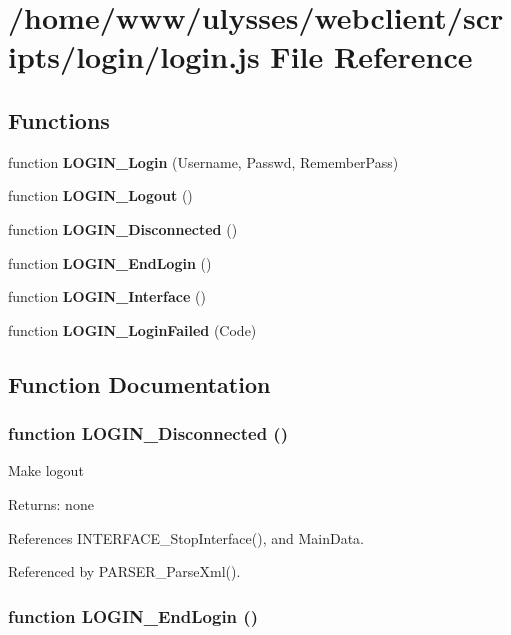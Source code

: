 \section{/home/www/ulysses/webclient/scripts/login/login.js File Reference}
\label{login_2login_8js}
\subsection*{Functions}
\begin{CompactItemize}
\item 
function {\bf LOGIN\_\-Login} (Username, Passwd, RememberPass)
\item 
function {\bf LOGIN\_\-Logout} ()
\item 
function {\bf LOGIN\_\-Disconnected} ()
\item 
function {\bf LOGIN\_\-EndLogin} ()
\item 
function {\bf LOGIN\_\-Interface} ()
\item 
function {\bf LOGIN\_\-LoginFailed} (Code)
\end{CompactItemize}


\subsection{Function Documentation}
\subsubsection{\setlength{\rightskip}{0pt plus 5cm}function LOGIN\_\-Disconnected ()}\label{login_2login_8js_3eb7f5e1dac7fc523bbecca5a20df215}


Make logout

\begin{Desc}
\item[Returns:]none \end{Desc}


References INTERFACE\_\-StopInterface(), and MainData.

Referenced by PARSER\_\-ParseXml().
\subsubsection{\setlength{\rightskip}{0pt plus 5cm}function LOGIN\_\-EndLogin ()}\label{login_2login_8js_0652e6ee839eb57fe5c2e5428b5be667}


